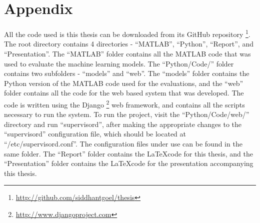 \chapter{Appendix}
\label{chapter:Appendix}

All the code used is this thesis can be downloaded from its GitHub repository \footnote{\url{http://github.com/siddhantgoel/thesis}}. The root directory contains 4 directories - ``MATLAB'', ``Python'', ``Report'', and ``Presentation''. The ``MATLAB'' folder contains all the MATLAB code that was used to evaluate the machine learning models. The ``Python/Code/'' folder contains two subfolders - ``models'' and ``web''. The ``models'' folder contains the Python version of the MATLAB code used for the evaluations, and the ``web'' folder contains all the code for the web based system that was developed. The code is written using the Django \footnote{\url{http://www.djangoproject.com}} web framework, and contains all the scripts necessary to run the system. To run the project, visit the ``Python/Code/web/'' directory and run ``supervisord'', after making the appropriate changes to the ``supervisord'' configuration file, which should be located at ``/etc/supervisord.conf''. The configuration files under use can be found in the same folder. The ``Report'' folder contains the \LaTeX code for this thesis, and the ``Presentation'' folder contains the \LaTeX code for the presentation accompanying this thesis.
